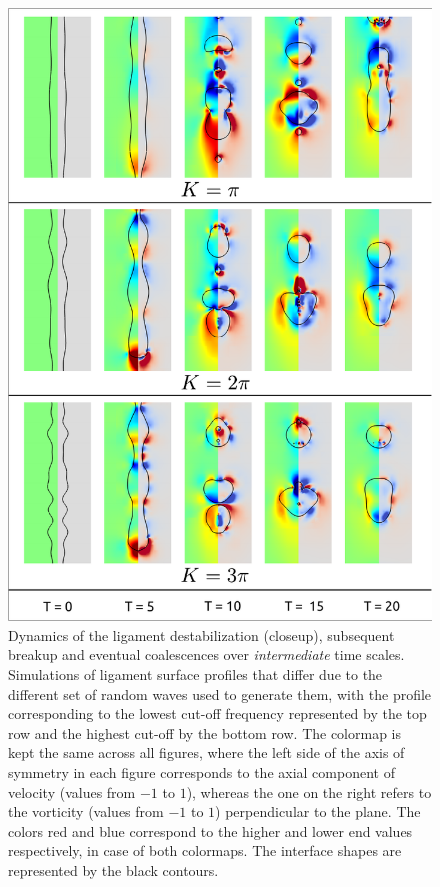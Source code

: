 \begin{figure}
\centering
\includegraphics{plots/ligament_breakup/wave_compare.pdf}
	\caption{Dynamics of the ligament destabilization (closeup), subsequent breakup 
	and eventual coalescences over \textit{intermediate} time scales.
	Simulations of ligament surface profiles that differ due to the 
	different set of random waves used to generate them, with the 
	profile corresponding to the lowest cut-off frequency represented 
	by the top row and the highest cut-off by the bottom row. 
	The colormap is kept the same across all figures, where the left 
	side of the axis of symmetry in each figure corresponds to the axial component of 
	velocity (values from $-1$ to $1$), whereas the one on the right refers to 
	the vorticity (values from $-1$ to $1$) perpendicular to the plane. 
	The colors red and blue correspond to the higher and lower 
	end values respectively, in case of both colormaps. 
	The interface shapes are represented by the black contours.
	}
\label{wave_comp}
\end{figure}



